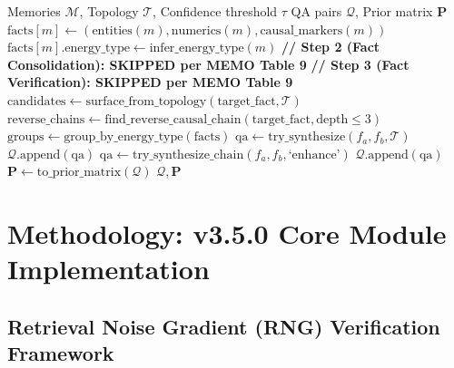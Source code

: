 \documentclass[11pt,a4paper]{article}
\begin{document}
\begin{algorithm}[H]
\caption{MEMO-Adapted Reflection QA Synthesis}
\label{alg:reflection}
\begin{algorithmic}[1]
\Require Memories \(\mathcal{M}\), Topology \(\mathcal{T}\), Confidence threshold \(\tau\)
\Ensure QA pairs \(\mathcal{Q}\), Prior matrix \(\mathbf{P}\)
 
    \State \(\text{facts}[m] \gets (\text{entities}(m), \text{numerics}(m), \text{causal\_markers}(m))\)
    \State \(\text{facts}[m].\text{energy\_type} \gets \text{infer\_energy\_type}(m)\)
\EndFor
\State \textbf{// Step 2 (Fact Consolidation): SKIPPED per MEMO Table 9}
\State \textbf{// Step 3 (Fact Verification): SKIPPED per MEMO Table 9}
 
    \State \(\text{candidates} \gets \text{surface\_from\_topology}(\text{target\_fact}, \mathcal{T})\)
    \State \(\text{reverse\_chains} \gets \text{find\_reverse\_causal\_chain}(\text{target\_fact}, \text{depth} \leq 3)\)
\EndFor
\State \(\text{groups} \gets \text{group\_by\_energy\_type}(\text{facts})\) 
 
        \State \(\text{qa} \gets \text{try\_synthesize}(f_a, f_b, \mathcal{T})\)
         \State \(\mathcal{Q}.\text{append}(\text{qa})\) \EndIf
    \EndFor
\EndFor
{} 
        \State \(\text{qa} \gets \text{try\_synthesize\_chain}(f_a, f_b, \text{`enhance'})\)
         \State \(\mathcal{Q}.\text{append}(\text{qa})\) \EndIf
    \EndFor
\EndFor
\State \(\mathbf{P} \gets \text{to\_prior\_matrix}(\mathcal{Q})\) 
\State \Return \(\mathcal{Q}, \mathbf{P}\)
\end{algorithmic}
\end{algorithm}

\section{Methodology: v3.5.0 Core Module Implementation}
\label{sec:methodology}

\subsection{Retrieval Noise Gradient (RNG) Verification Framework}
\end{document}
